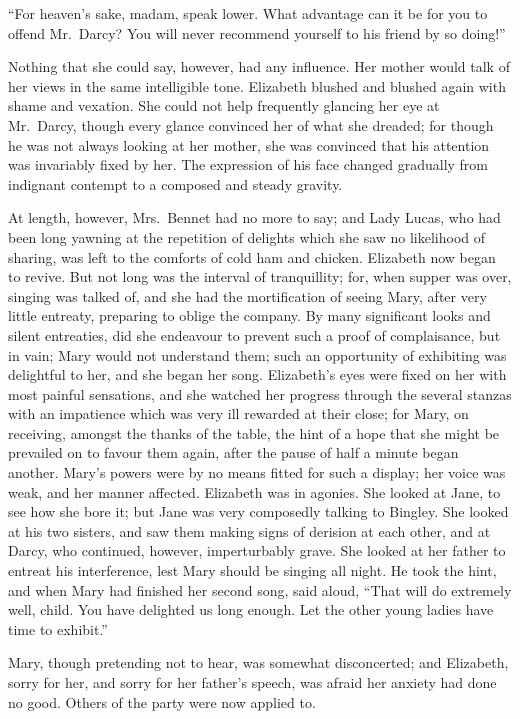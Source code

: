 ``For heaven's sake, madam, speak lower.  What advantage can
it be for you to offend Mr.\ Darcy?  You will never recommend
yourself to his friend by so doing!''

Nothing that she could say, however, had any influence.  Her
mother would talk of her views in the same intelligible tone.
Elizabeth blushed and blushed again with shame and vexation.
She could not help frequently glancing her eye at Mr.\ Darcy,
though every glance convinced her of what she dreaded; for
though he was not always looking at her mother, she was
convinced that his attention was invariably fixed by her.
The expression of his face changed gradually from indignant
contempt to a composed and steady gravity.

At length, however, Mrs.\ Bennet had no more to say; and Lady
Lucas, who had been long yawning at the repetition of delights
which she saw no likelihood of sharing, was left to the comforts
of cold ham and chicken.  Elizabeth now began to revive.  But
not long was the interval of tranquillity; for, when supper was
over, singing was talked of, and she had the mortification of
seeing Mary, after very little entreaty, preparing to oblige the
company.  By many significant looks and silent entreaties, did
she endeavour to prevent such a proof of complaisance, but in
vain; Mary would not understand them; such an opportunity of
exhibiting was delightful to her, and she began her song.
Elizabeth's eyes were fixed on her with most painful sensations,
and she watched her progress through the several stanzas with
an impatience which was very ill rewarded at their close; for
Mary, on receiving, amongst the thanks of the table, the hint of
a hope that she might be prevailed on to favour them again, after
the pause of half a minute began another.  Mary's powers were
by no means fitted for such a display; her voice was weak, and
her manner affected.  Elizabeth was in agonies.  She looked at
Jane, to see how she bore it; but Jane was very composedly
talking to Bingley.  She looked at his two sisters, and saw
them making signs of derision at each other, and at Darcy, who
continued, however, imperturbably grave.  She looked at her
father to entreat his interference, lest Mary should be singing all
night.  He took the hint, and when Mary had finished her second
song, said aloud, ``That will do extremely well, child.  You have
delighted us long enough.  Let the other young ladies have time
to exhibit.''

Mary, though pretending not to hear, was somewhat disconcerted;
and Elizabeth, sorry for her, and sorry for her father's speech,
was afraid her anxiety had done no good.  Others of the party
were now applied to.

